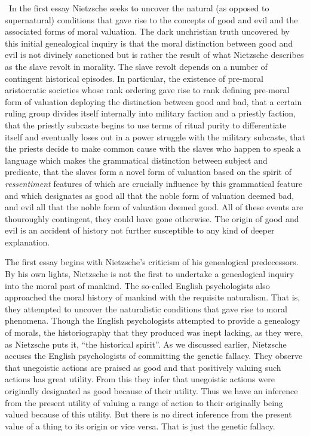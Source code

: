 \change\ In the first essay Nietzsche seeks to uncover the natural (as opposed to supernatural) conditions that gave rise to the concepts of good and evil and the associated forms of moral valuation. The dark unchristian truth uncovered by this initial genealogical inquiry is that the moral distinction between good and evil is not divinely sanctioned but is rather the result of what Nietzsche describes as the slave revolt in morality. The slave revolt depends on a number of contingent historical episodes. In particular, the existence of pre-moral aristocratic societies whose rank ordering gave rise to rank defining pre-moral form of valuation deploying the distinction between good and bad, that a certain ruling group divides itself internally into military faction and a priestly faction, that the priestly subcaste begins to use terms of ritual purity to differentiate itself and eventually loses out in a power struggle with the military subcaste, that the priests decide to make common cause with the slaves who happen to speak a language which makes the grammatical distinction between subject and predicate, that the slaves form a novel form of valuation based on the spirit of \emph{ressentiment} features of which are crucially influence by this grammatical feature and which designates as good all that the noble form of valuation deemed bad, and evil all that the noble form of valuation deemed good. All of these events are thouroughly contingent, they could have gone otherwise. The origin of good and evil is an accident of history not further susceptible to any kind of deeper explanation.

The first essay begins with Nietzsche's criticism of his genealogical predecessors. By his own lights, Nietzsche is not the first to undertake a genealogical inquiry into the moral past of mankind. The so-called English psychologists also approached the moral history of mankind with the requisite naturalism. That is, they attempted to uncover the naturalistic conditions that gave rise to moral phenomena. Though the English psychologists attempted to provide a genealogy of morals, the historiography that they produced was inept lacking, as they were, as Nietzsche puts it, ``the historical spirit''. As we discussed earlier, Nietzsche accuses the English psychologists of committing the genetic fallacy. They observe that unegoistic actions are praised as good and that positively valuing such actions has great utility. From this they infer that unegoistic actions were originally designated as good because of their utility. Thus we have an inference from the present utility of valuing a range of action to their originally being valued because of this utility. But there is no direct inference from the present value of a thing to its origin or vice versa. That is just the genetic fallacy.

